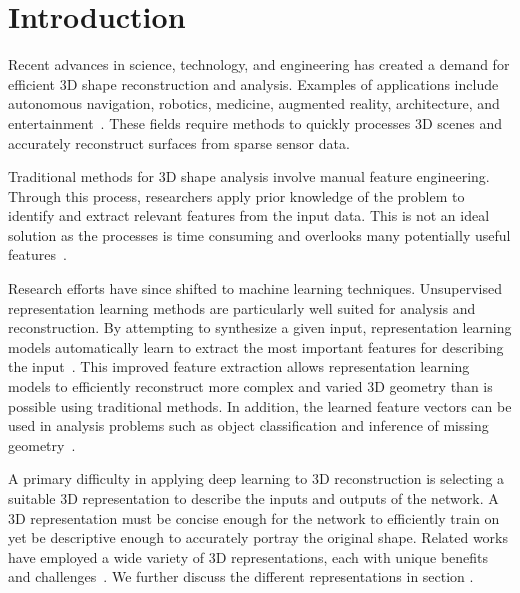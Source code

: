 
\chapter{Introduction}
\label{chap:introduction}

Recent advances in science, technology, and engineering has created a demand for efficient 3D shape reconstruction and analysis. Examples of applications include autonomous navigation, robotics, medicine, augmented reality, architecture, and entertainment~\cite{Xiao2020, Xie2022}. These fields require methods to quickly processes 3D scenes and accurately reconstruct surfaces from sparse sensor data.

Traditional methods for 3D shape analysis involve manual feature engineering. Through this process, researchers apply prior knowledge of the problem to identify and extract relevant features from the input data. This is not an ideal solution as the processes is time consuming and overlooks many potentially useful features~\cite{Bengio2013}.

Research efforts have since shifted to machine learning techniques. Unsupervised representation learning methods are particularly well suited for analysis and reconstruction. By attempting to synthesize a given input, representation learning models automatically learn to extract the most important features for describing the input~\cite{Bengio2013}. This improved feature extraction allows representation learning models to efficiently reconstruct more complex and varied 3D geometry than is possible using traditional methods. In addition, the learned feature vectors can be used in analysis problems such as object classification and inference of missing geometry~\cite{Park2019}.

A primary difficulty in applying deep learning to 3D reconstruction is selecting a suitable 3D representation to describe the inputs and outputs of the network. A 3D representation must be concise enough for the network to efficiently train on yet be descriptive enough to accurately portray the original shape. Related works have employed a wide variety of 3D representations, each with unique benefits and challenges~\cite{Xiao2020}. We further discuss the different representations in section .


